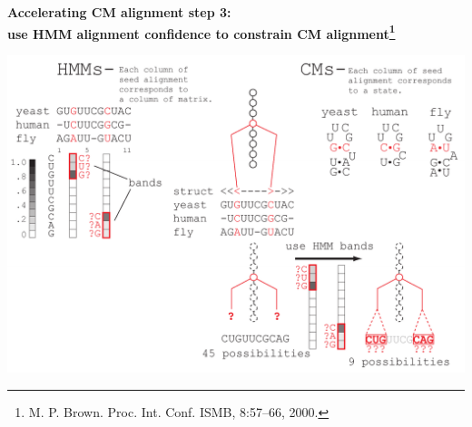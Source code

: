 \documentclass[landscape]{slides}
\begin{document}
\begin{slide}
\begin{slide}
\begin{center}
\textbf{Accelerating CM alignment step 3: \\ use HMM alignment
  confidence to constrain CM alignment\footnote{M. P. Brown. Proc. Int. Conf. ISMB, 8:57–66, 2000.}}
\end{center}
\medskip
\small
\begin{center}
\includegraphics[width=8in]{figs/post_hmm_to_cm_map2_layer16}
\end{center}
\vfill
\end{slide}
\begin{slide}

\end{slide}
\end{slide}
\end{document}
